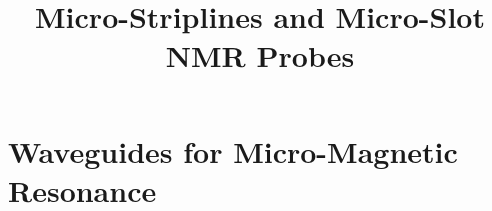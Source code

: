 \documentclass[]{book}
\title{Micro-Striplines and Micro-Slot NMR Probes}
\begin{document}
	\maketitle
	
	\chapter{Waveguides for Micro-Magnetic Resonance}
	
	
	
	
	
	
	
	
	
\end{document}
